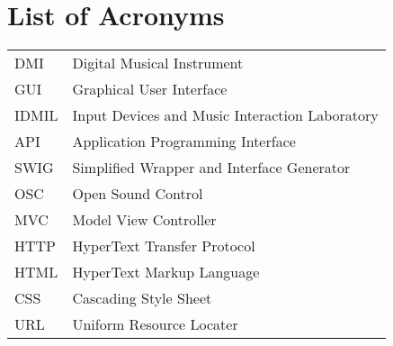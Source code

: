 \documentclass [12pt, letterpaper]{report}
\begin{document}
\pagebreak


\tableofcontents
\listoffigures

\listoftables

\newpage
\chapter*{List of Acronyms}

\begin{longtable}{ll}
    DMI 	& 	Digital Musical Instrument\\
    GUI		& 	Graphical User Interface\\
    IDMIL &   Input Devices and Music Interaction Laboratory\\ 
    API   &   Application Programming Interface\\
    SWIG  &   Simplified Wrapper and Interface Generator\\
    OSC   &   Open Sound Control\\
    MVC   &   Model View Controller\\
    HTTP  &   HyperText Transfer Protocol\\
    HTML  &   HyperText Markup Language\\
    CSS   &   Cascading Style Sheet\\
    URL   &   Uniform Resource Locater\\
\end{longtable}

\cleardoublepage
{}

%
%
\typeout{}

%
\typeout{}

%
\typeout{}

%
\typeout{}

%
\typeout{}

%
\typeout{}




%
%

\typeout{}
    \renewcommand\refname{References}
    \nocite{*}
    
\end{document}
